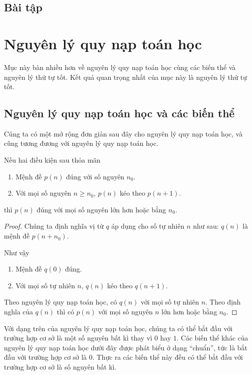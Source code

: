 \subsection{Bài tập}

\section{Nguyên lý quy nạp toán học}\label{section:principle-of-mathematical-induction}

Mục này bàn nhiều hơn về nguyên lý quy nạp toán học cùng các biến thể và nguyên lý thứ tự tốt. Kết quả quan trọng nhất của mục này là nguyên lý thứ tự tốt.

\subsection{Nguyên lý quy nạp toán học và các biến thể}

Cúng ta có một mở rộng đơn giản sau đây cho nguyên lý quy nạp toán học, và cũng tương đương với nguyên lý quy nạp toán học.

\begin{theorem}
	Nếu hai điều kiện sau thỏa mãn
	\begin{enumerate}[label={(\roman*)}]
		\item Mệnh đề $p(n)$ đúng với số nguyên $n_{0}$.
		\item Với mọi số nguyên $n\geq n_{0}$, $p(n)$ kéo theo $p(n + 1)$.
	\end{enumerate}

	thì $p(n)$ đúng với mọi số nguyên lớn hơn hoặc bằng $n_{0}$.
\end{theorem}

\begin{proof}
	Chúng ta định nghĩa vị từ $q$ áp dụng cho số tự nhiên $n$ như sau: $q(n)$ là mệnh đề $p(n + n_{0})$.

	Như vậy
	\begin{enumerate}[label={(\roman*)}]
		\item Mệnh đề $q(0)$ đúng.
		\item Với mọi số tự nhiên $n$, $q(n)$ kéo theo $q(n + 1)$.
	\end{enumerate}

	Theo nguyên lý quy nạp toán học, có $q(n)$ với mọi số tự nhiên $n$. Theo định nghĩa của $q(n)$ thì có $p(n)$ với mọi số nguyên $n$ lớn hơn hoặc bằng $n_{0}$.
\end{proof}

Với dạng trên của nguyên lý quy nạp toán học, chúng ta có thể bắt đầu với trường hợp cơ sở là một số nguyên bất kì thay vì $0$ hay $1$. Các biến thể khác của nguyên lý quy nạp toán học dưới đây được phát biểu ở dạng ``chuẩn'', tức là bắt đầu với trường hợp cơ sở là $0$. Thực ra các biến thể này đều có thể bắt đầu với trường hợp cơ sở là số nguyên bất kì.

